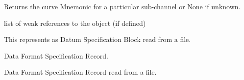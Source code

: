 \documentclass[letterpaper,10pt,english]{sphinxmanual}
\begin{document}
\begin{fulllineitems}
\begin{fulllineitems}
\label{\detokenize{ref/LIS/core/LogiRec:TotalDepth.LIS.core.LogiRec.DatumSpecBlock.subChMnem}}
Returns the curve Mnemonic for a particular sub-channel or None if unknown.

\end{fulllineitems}


\begin{fulllineitems}
\label{\detokenize{ref/LIS/core/LogiRec:TotalDepth.LIS.core.LogiRec.DatumSpecBlock.__weakref__}}
list of weak references to the object (if defined)

\end{fulllineitems}


\end{fulllineitems}


\begin{fulllineitems}
\label{\detokenize{ref/LIS/core/LogiRec:TotalDepth.LIS.core.LogiRec.DatumSpecBlockRead}}
This represents as Datum Specification Block read from a file.

\end{fulllineitems}


\begin{fulllineitems}
\label{\detokenize{ref/LIS/core/LogiRec:TotalDepth.LIS.core.LogiRec.LrDFSR}}
Data Format Specification Record.

\end{fulllineitems}


\begin{fulllineitems}
\label{\detokenize{ref/LIS/core/LogiRec:TotalDepth.LIS.core.LogiRec.LrDFSRRead}}
Data Format Specification Record read from a file.

\end{fulllineitems}
\end{document}

